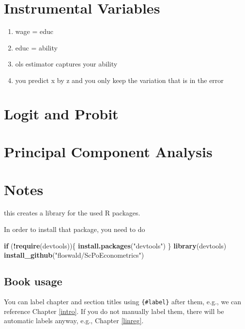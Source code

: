 \documentclass[]{book}
\newenvironment{Shaded}{\begin{snugshade}}{\end{snugshade}}
\newcommand{\KeywordTok}[1]{\textcolor[rgb]{0.13,0.29,0.53}{\textbf{#1}}}
\newcommand{\StringTok}[1]{\textcolor[rgb]{0.31,0.60,0.02}{#1}}
\newcommand{\ControlFlowTok}[1]{\textcolor[rgb]{0.13,0.29,0.53}{\textbf{#1}}}
\newcommand{\OperatorTok}[1]{\textcolor[rgb]{0.81,0.36,0.00}{\textbf{#1}}}
\newcommand{\NormalTok}[1]{#1}
\providecommand{\tightlist}{%
  \setlength{\itemsep}{0pt}\setlength{\parskip}{0pt}}
\theoremstyle{definition}
\theoremstyle{definition}
\theoremstyle{definition}
\theoremstyle{remark}
\begin{document}
\chapter{Instrumental Variables}\label{IV}

\begin{enumerate}
\def\labelenumi{\arabic{enumi}.}
\tightlist
\item
  wage = educ
\item
  educ = ability
\item
  ols estimator captures your ability
\item
  you predict x by z and you only keep the variation that is in the
  error
\end{enumerate}

\chapter{Logit and Probit}\label{logit-probit}

\chapter{Principal Component Analysis}\label{pca}

\chapter{Notes}\label{notes}

this creates a library for the used R packages.

In order to install that package, you need to do

\begin{Shaded}
\begin{Highlighting}[]
\ControlFlowTok{if}\NormalTok{ (}\OperatorTok{!}\KeywordTok{require}\NormalTok{(devtools))\{}
  \KeywordTok{install.packages}\NormalTok{(}\StringTok{"devtools"}\NormalTok{)}
\NormalTok{\}}
\KeywordTok{library}\NormalTok{(devtools)}
\KeywordTok{install_github}\NormalTok{(}\StringTok{"floswald/ScPoEconometrics"}\NormalTok{)  }
\end{Highlighting}
\end{Shaded}

\section{Book usage}\label{book-usage}

You can label chapter and section titles using \texttt{\{\#label\}}
after them, e.g., we can reference Chapter \ref{intro}. If you do not
manually label them, there will be automatic labels anyway, e.g.,
Chapter \ref{linreg}.
\end{document}
